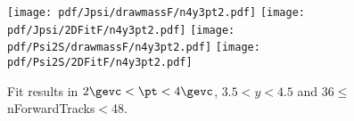 \begin{figure}[H]
\begin{center}
\texttt{[image: pdf/Jpsi/drawmassF/n4y3pt2.pdf]}
\texttt{[image: pdf/Jpsi/2DFitF/n4y3pt2.pdf]}
\vspace*{-0.5cm}
\texttt{[image: pdf/Psi2S/drawmassF/n4y3pt2.pdf]}
\texttt{[image: pdf/Psi2S/2DFitF/n4y3pt2.pdf]}
\vspace*{-0.5cm}
\end{center}
\caption{Fit results in $2\gevc<\pt<4\gevc$, $3.5<y<4.5$ and 36$\leq$nForwardTracks$<$48.}
\label{Fitn4y3pt2}
\end{figure}
